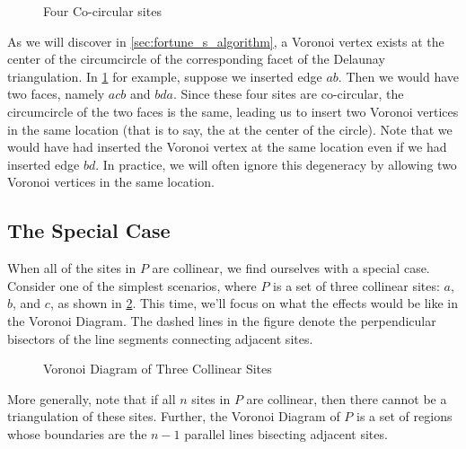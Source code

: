 \documentclass[12pt,twoside]{reedthesis}
\begin{document}
      \begin{figure}[H]
        \centering
        
        \caption{Four Co-circular sites}
        \label{fig:co_circular}
      \end{figure}

      As we will discover in \cref{sec:fortune_s_algorithm}, a Voronoi vertex exists at the center of the circumcircle of the corresponding facet of the Delaunay triangulation. In \cref{fig:co_circular} for example, suppose we inserted edge $ab$. Then we would have two faces, namely $acb$ and $bda$. Since these four sites are co-circular, the circumcircle of the two faces is the same, leading us to insert two Voronoi vertices in the same location (that is to say, the at the center of the circle). Note that we would have had inserted the Voronoi vertex at the same location even if we had inserted edge $bd$. In practice, we will often ignore this degeneracy by allowing two Voronoi vertices in the same location.\par

    \subsection{The Special Case} %
    \label{sub:special_case}

      When all of the sites in $P$ are collinear, we find ourselves with a special case. Consider one of the simplest scenarios, where $P$ is a set of three collinear sites: $a$, $b$, and $c$, as shown in \cref{fig:collinear}. This time, we'll focus on what the effects would be like in the Voronoi Diagram. The dashed lines in the figure denote the perpendicular bisectors of the line segments connecting adjacent sites.
      \begin{figure}[!htb]
        \centering
        
        \caption{Voronoi Diagram of Three Collinear Sites}
        \label{fig:collinear}
      \end{figure}

      \noindent More generally, note that if all $n$ sites in $P$ are collinear, then there cannot be a triangulation of these sites. Further, the Voronoi Diagram of $P$ is a set of regions whose boundaries are the $n-1$ parallel lines bisecting adjacent sites. 



\end{document}
